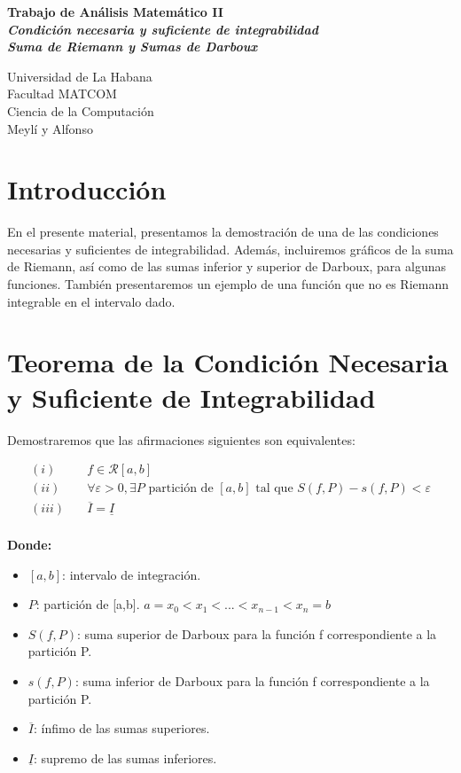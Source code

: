 \documentclass[a4paper,12pt]{article}
\title{}
\author{}
\date{}
\begin{document}
	
\begin{titlepage}
	\centering
	\vspace*{1in}
	{\Huge \textbf{Trabajo de Análisis Matemático II}} \\[2cm]
	{\LARGE \textbf{\textit{{Condición necesaria y suficiente de integrabilidad}}}} \\[0.5cm]
	{\LARGE \textbf{\textit{{Suma de Riemann y Sumas de Darboux}}}}\\[1cm]
	
	
	\vfill 
	
	
	\begin{minipage}{\textwidth}
		\raggedright
		{\large Universidad de La Habana} \\[1cm]
		{\large Facultad MATCOM} \\[1cm]
		{\large Ciencia de la Computación} \\[0.5cm]
		{\large Meylí y Alfonso}
	\end{minipage}
\end{titlepage}
	\section{Introducción}
	En el presente material, presentamos la demostración de una de las condiciones necesarias y suficientes de integrabilidad. Además, incluiremos gráficos de la suma de Riemann, así como de las sumas inferior y superior de Darboux, para algunas funciones. También presentaremos un ejemplo de una función que no es Riemann integrable en el intervalo dado.
	
	\section{Teorema de la Condición Necesaria y Suficiente de Integrabilidad}
	Demostraremos que las afirmaciones siguientes son equivalentes:
	
	\[
	\begin{aligned}
		(i) &\quad f \in \mathcal{R}[a,b]  \\
		(ii) &\quad \forall \varepsilon > 0, \exists P \text{ partición de } [a,b] \text{ tal que } S(f,P) - s(f,P) < \varepsilon  \\
		(iii) &\quad \overline{I} = \underline{I}
	\end{aligned}
	\]
	\quad \\
	
	
	\textbf{Donde:}
	\begin{itemize}
		\item \( [a,b] \): intervalo de integración.
		\item \( P \): partición de [a,b]. $ a = x_0 < x_1 < ... < x_{n-1} < x_n = b $
		\item \( S(f,P) \): suma superior de Darboux para la función f correspondiente a la partición P.
		\item \( s(f,P) \): suma inferior de Darboux para la función f correspondiente a la partición P.
		\item \( \overline{I} \): ínfimo de las sumas superiores.
		\item \( \underline{I} \): supremo de las sumas inferiores.
	\end{itemize}
	
\end{document}
